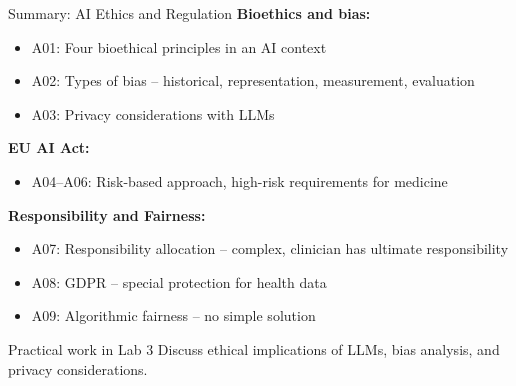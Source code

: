 \documentclass[aspectratio=169, 10pt]{beamer}
\begin{document}
\begin{frame}{Summary: AI Ethics and Regulation}
    \textbf{Bioethics and bias:}
    \begin{itemize}
        \item A01: Four bioethical principles in an AI context
        \item A02: Types of bias -- historical, representation, measurement, evaluation
        \item A03: Privacy considerations with LLMs
    \end{itemize}
    
    \textbf{EU AI Act:}
    \begin{itemize}
        \item A04--A06: Risk-based approach, high-risk requirements for medicine
    \end{itemize}
    
    \textbf{Responsibility and Fairness:}
    \begin{itemize}
        \item A07: Responsibility allocation -- complex, clinician has ultimate responsibility
        \item A08: GDPR -- special protection for health data
        \item A09: Algorithmic fairness -- no simple solution
    \end{itemize}
    
    \vspace{0.3cm}
    \begin{block}{Practical work in Lab 3}
        Discuss ethical implications of LLMs, bias analysis, and privacy considerations.
    \end{block}
\end{frame}
\end{document}
